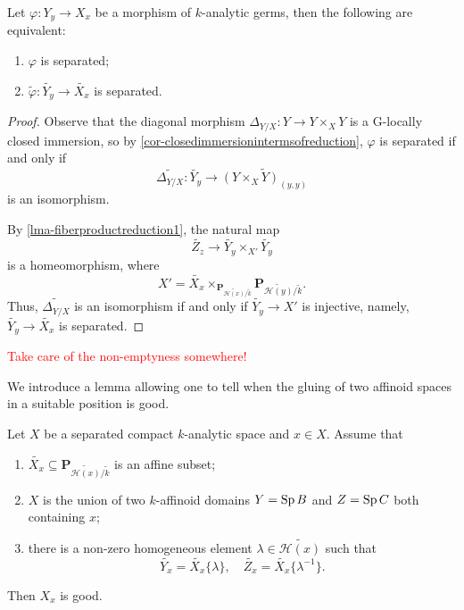 \begin{corollary}\label{cor-separatednessreductioncri}
    Let $\varphi:Y_y\rightarrow X_x$ be a morphism of $k$-analytic germs, then the following are equivalent:
    \begin{enumerate}
        \item $\varphi$ is separated;
        \item $\tilde{\varphi}:\widetilde{Y_y}\rightarrow \widetilde{X_x}$ is separated.
    \end{enumerate}
\end{corollary}
\begin{proof}
    Observe that the diagonal morphism $\Delta_{Y/X}:Y\rightarrow Y\times_X Y$ is a G-locally closed immersion, so by \cref{cor-closedimmersionintermsofreduction}, $\varphi$ is separated if and only if 
    \[
        \widetilde{\Delta_{Y/X}}: \widetilde{Y_y}\rightarrow \widetilde{(Y\times_X Y)_{(y,y)}} 
    \] 
    is an isomorphism.

    By \cref{lma-fiberproductreduction1}, the natural map
    \[
        \widetilde{Z_z}\rightarrow \widetilde{Y_y}\times_{X'}  \widetilde{Y_y}
    \]
    is a homeomorphism, where 
    \[
        X'=\widetilde{X_x}\times_{\mathbf{P}_{\widetilde{\mathscr{H}(x)}/\tilde{k}}}\mathbf{P}_{\widetilde{\mathscr{H}(y)}/\tilde{k}}.
    \]
    Thus, $\widetilde{\Delta_{Y/X}}$ is an isomorphism if and only if $\widetilde{Y_y}\rightarrow X'$ is injective, namely, $\widetilde{Y_y}\rightarrow \widetilde{X_x}$ is separated.
\end{proof}

\textcolor{red}{Take care of the non-emptyness somewhere!}

We introduce a lemma allowing one to tell when the gluing of two affinoid spaces in a suitable position is good.
\begin{lemma}\label{lma-glueaffinetogood}
    Let $X$ be a separated compact $k$-analytic space and $x\in X$. Assume that
    \begin{enumerate}
        \item $\widetilde{X_x}\subseteq \mathbf{P}_{\widetilde{\mathscr{H}(x)}/\tilde{k}}$ is an affine subset;
        \item $X$ is the union of two $k$-affinoid domains $Y=\operatorname{Sp} B$ and $Z=\operatorname{Sp} C$ both containing $x$;
        \item there is a non-zero homogeneous element $\lambda\in \widetilde{\mathscr{H}(x)}$ such that
        \[
            \widetilde{Y_x}=\widetilde{X_x}\{\lambda\},\quad   \widetilde{Z_x}=\widetilde{X_x}\{\lambda^{-1}\}.
        \]
    \end{enumerate}
    Then $X_x$ is good.
\end{lemma}

